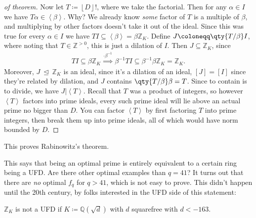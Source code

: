 \begin{proof}[of theorem]
Now let \(T \coloneqq{\left\lfloor D \right\rfloor} !\), where we take
the factorial. Then for any \(\alpha\in I\) we have
\(T \alpha \in \left\langle{ \beta }\right\rangle\). Why? We already
know \emph{some} factor of \(T\) is a multiple of \(\beta\), and
multiplying by other factors doesn't take it out of the ideal. Since
this was true for every \(\alpha\in I\) we have
\(TI \subseteq \left\langle{ \beta }\right\rangle = \beta{\mathbb{Z}}_K\).
Define \(J \coloneqq\qty{T/ \beta} I\), where noting that
\(T\in {\mathbb{Z}}^{> 0}\), this is just a dilation of \(I\). Then
\(J \subseteq {\mathbb{Z}}_K\), since
\begin{align*}
TI \subseteq \beta{\mathbb{Z}}_K \overset{\cdot \beta^{-1}}{\implies } \beta^{-1}T I \subseteq \beta^{-1}\beta {\mathbb{Z}}_K = {\mathbb{Z}}_K
.\end{align*}
Moreover, \(J {~\trianglelefteq~}{\mathbb{Z}}_K\) is an ideal, since
it's a dilation of an ideal, \([J] = [I]\) since they're related by
dilation, and \(J\) contains \(\qty{T / \beta } \beta = T\). Since to
contain is to divide, we have
\(J \mathrel{\Big|}\left\langle{ T }\right\rangle\). Recall that \(T\)
was a product of integers, so however \(\left\langle{ T }\right\rangle\)
factors into prime ideals, every such prime ideal will lie above an
actual prime no bigger than \(D\). You can factor
\(\left\langle{ T }\right\rangle\) by first factoring \(T\) into prime
integers, then break them up into prime ideals, all of which would have
norm bounded by \(D\).

\end{proof}

\begin{remark}

This proves Rabinowitz's theorem.

\end{remark}

\begin{remark}

This says that being an optimal prime is entirely equivalent to a
certain ring being a UFD. Are there other optimal examples than
\(q=41\)? It turns out that there are \emph{no} optimal \(f_q\) for
\(q>41\), which is not easy to prove. This didn't happen until the 20th
century, by folks interested in the UFD side of this statement:

\end{remark}

\begin{theorem}

\({\mathbb{Z}}_K\) is not a UFD if
\(K \coloneqq{\mathbb{Q}}( \sqrt{d} )\) with \(d\) squarefree with
\(d<-163\).

\end{theorem}

